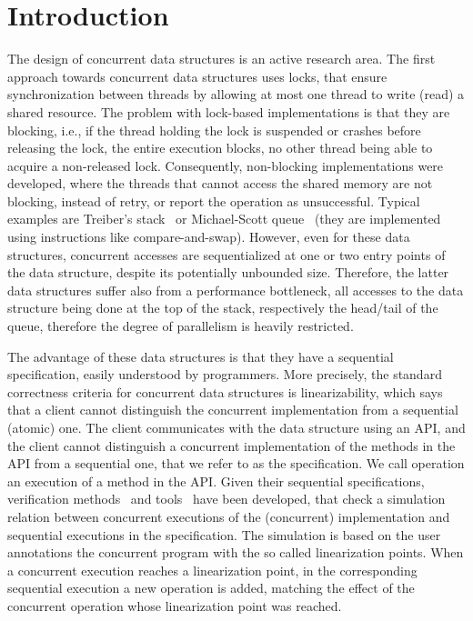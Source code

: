 
  \section{Introduction}
  
  
The design of concurrent data structures is an active research area.  
The first approach towards concurrent data structures uses locks, that ensure synchronization between threads by allowing at most one thread to write (read) a shared resource. 
The problem with lock-based implementations is that they are blocking, i.e., if the thread holding the lock is suspended or crashes before releasing the lock, the entire execution blocks, no other thread being able to acquire a non-released lock. 
Consequently, non-blocking implementations were developed, where the threads that cannot access the shared memory are not blocking, instead of retry, or report the operation as unsuccessful.  
Typical examples are Treiber's stack~\cite{DBLP:conf/spaa/HendlerSY04} or Michael-Scott queue~\cite{msqueue} (they are implemented using instructions like compare-and-swap).  
However, even for these data structures, concurrent accesses are sequentialized at one or two entry points of the data structure, despite its potentially unbounded size. Therefore, the latter data structures suffer also from a performance bottleneck, all accesses to the data structure being done at the top of the stack, respectively the head/tail of the queue, therefore the degree of parallelism is heavily restricted.  

The advantage of these data structures is that they have a sequential specification, easily understood by programmers. More precisely, the standard correctness criteria for concurrent data structures is linearizability, which says that a client cannot distinguish  the concurrent implementation from a sequential (atomic) one. 
The client communicates with the data structure using an API, and the client cannot distinguish  a concurrent implementation of the methods in the API from a sequential one, that we refer to as the specification. We call operation an execution of a method in the API. 
Given their sequential specifications, verification methods~\cite{threadmodular,vv1,vv2} and tools~\cite{vv1} have been developed, that check a simulation relation between concurrent executions of the (concurrent) implementation and sequential executions in the specification. 
 The simulation is based on the user annotations the concurrent program with the so called linearization points. When a concurrent execution reaches a linearization point,  in the corresponding sequential execution a new operation is added, matching the effect of the concurrent operation whose linearization point was reached.    



